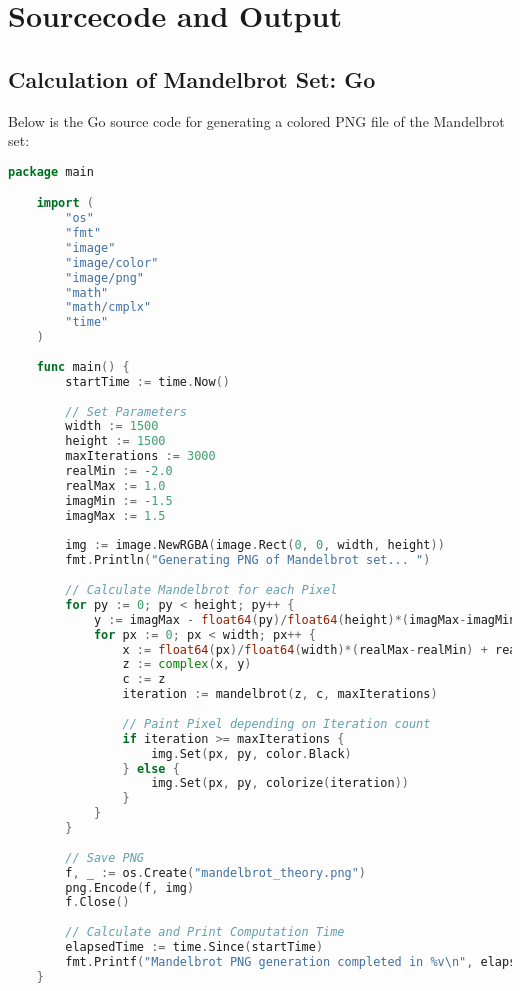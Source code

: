 \section{Sourcecode and Output}

\subsection{Calculation of Mandelbrot Set: Go}
\label{app:code:mandelbrot1}
Below is the Go source code for generating a colored PNG file of the Mandelbrot set:

\begin{lstlisting}[language=go, frame=tb, caption={Mandelbrot Set Calculation}]
    package main

    import (
        "os"
        "fmt"
        "image"
        "image/color"
        "image/png"
        "math"
        "math/cmplx"
        "time"
    )
    
    func main() {
        startTime := time.Now()
    
        // Set Parameters
        width := 1500
        height := 1500
        maxIterations := 3000
        realMin := -2.0
        realMax := 1.0
        imagMin := -1.5
        imagMax := 1.5
    
        img := image.NewRGBA(image.Rect(0, 0, width, height))
        fmt.Println("Generating PNG of Mandelbrot set... ")
    
        // Calculate Mandelbrot for each Pixel
        for py := 0; py < height; py++ {
            y := imagMax - float64(py)/float64(height)*(imagMax-imagMin)
            for px := 0; px < width; px++ {
                x := float64(px)/float64(width)*(realMax-realMin) + realMin
                z := complex(x, y)
                c := z
                iteration := mandelbrot(z, c, maxIterations)
    
                // Paint Pixel depending on Iteration count
                if iteration >= maxIterations {
                    img.Set(px, py, color.Black)
                } else {
                    img.Set(px, py, colorize(iteration))
                }
            }
        }
    
        // Save PNG
        f, _ := os.Create("mandelbrot_theory.png")
        png.Encode(f, img)
        f.Close()
    
        // Calculate and Print Computation Time
        elapsedTime := time.Since(startTime)
        fmt.Printf("Mandelbrot PNG generation completed in %v\n", elapsedTime)
    }
    

\end{lstlisting}
